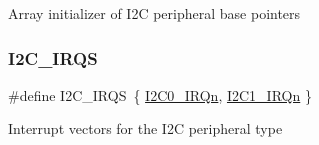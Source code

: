 Array initializer of I2C peripheral base pointers \mbox{\label{group___i2_c___peripheral___access___layer_gaa8773ffc80a322ac3833d4ad1853185a}} 
\subsubsection{\texorpdfstring{I2C\_IRQS}{I2C\_IRQS}}
{\footnotesize\ttfamily \#define I2\+C\+\_\+\+I\+R\+QS~\{ \mbox{\hyperlink{group___interrupt__vector__numbers_gga666eb0caeb12ec0e281415592ae89083a0f1945c7372a6de732306ea3801c8e2a}{I2\+C0\+\_\+\+I\+R\+Qn}}, \mbox{\hyperlink{group___interrupt__vector__numbers_gga666eb0caeb12ec0e281415592ae89083af651b1769e03e4653b1a4a7c88132398}{I2\+C1\+\_\+\+I\+R\+Qn}} \}}

Interrupt vectors for the I2C peripheral type 